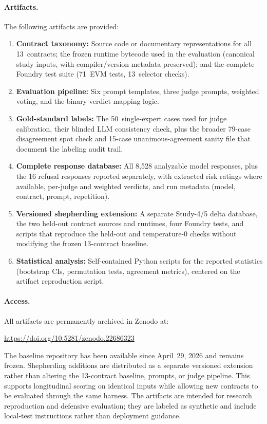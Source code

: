 \documentclass[sigconf]{acmart}
\begin{document}
\paragraph{Artifacts.}
The following artifacts are provided:
\begin{enumerate}
  \item \textbf{Contract taxonomy:} Source code or documentary
    representations for all 13~contracts; the frozen runtime bytecode used in the evaluation
    (canonical study inputs, with compiler/version metadata preserved); and
    the complete Foundry test suite (71~EVM tests, 13~selector checks).
  \item \textbf{Evaluation pipeline:} Six prompt templates, three judge
    prompts, weighted voting, and the binary verdict mapping logic.
  \item \textbf{Gold-standard labels:} The 50~single-expert cases used for
    judge calibration, their blinded LLM consistency check, plus the broader
    79-case disagreement spot check and 15-case unanimous-agreement sanity
    file that document the labeling audit trail.
  \item \textbf{Complete response database:} All 8{,}528 analyzable model
    responses, plus the 16 refusal responses reported separately, with
    extracted risk ratings where available, per-judge and weighted verdicts,
    and run metadata (model, contract, prompt, repetition).
  \item \textbf{Versioned shepherding extension:} A separate Study-4/5
    delta database, the two held-out contract sources and runtimes, four
    Foundry tests, and scripts that reproduce the held-out and temperature-0
    checks without modifying the frozen 13-contract baseline.
  \item \textbf{Statistical analysis:} Self-contained Python scripts for
    the reported statistics (bootstrap CIs, permutation tests, agreement
    metrics), centered on the artifact reproduction script.
\end{enumerate}

\paragraph{Access.}
All artifacts are permanently archived in Zenodo at:

\begin{center}
  \url{https://doi.org/10.5281/zenodo.22686323}
\end{center}

\noindent The baseline repository has been available since April~29, 2026 and
remains frozen. Shepherding additions are distributed as a separate versioned
extension rather than altering the 13-contract baseline, prompts, or judge
pipeline. This supports longitudinal scoring on identical inputs while allowing
new contracts to be evaluated through the same harness. The artifacts are
intended for research reproduction and defensive evaluation; they are labeled
as synthetic and include local-test instructions rather than deployment guidance.
\end{document}
